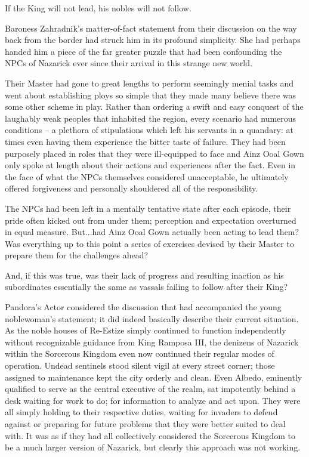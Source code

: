  

If the King will not lead, his nobles will not follow.

 

Baroness Zahradnik’s matter-of-fact statement from their discussion on the way back from the border had struck him in its profound simplicity. She had perhaps handed him a piece of the far greater puzzle that had been confounding the NPCs of Nazarick ever since their arrival in this strange new world.

 

Their Master had gone to great lengths to perform seemingly menial tasks and went about establishing ploys so simple that they made many believe there was some other scheme in play. Rather than ordering a swift and easy conquest of the laughably weak peoples that inhabited the region, every scenario had numerous conditions – a plethora of stipulations which left his servants in a quandary: at times even having them experience the bitter taste of failure. They had been purposely placed in roles that they were ill-equipped to face and Ainz Ooal Gown only spoke at length about their actions and experiences after the fact. Even in the face of what the NPCs themselves considered unacceptable, he ultimately offered forgiveness and personally shouldered all of the responsibility.

 

The NPCs had been left in a mentally tentative state after each episode, their pride often kicked out from under them; perception and expectation overturned in equal measure. But...had Ainz Ooal Gown actually been acting to lead them? Was everything up to this point a series of exercises devised by their Master to prepare them for the challenges ahead?

 

And, if this was true, was their lack of progress and resulting inaction as his subordinates essentially the same as vassals failing to follow after their King?

 

Pandora’s Actor considered the discussion that had accompanied the young noblewoman’s statement; it did indeed basically describe their current situation. As the noble houses of Re-Estize simply continued to function independently without recognizable guidance from King Ramposa III, the denizens of Nazarick within the Sorcerous Kingdom even now continued their regular modes of operation. Undead sentinels stood silent vigil at every street corner; those assigned to maintenance kept the city orderly and clean. Even Albedo, eminently qualified to serve as the central executive of the realm, sat impotently behind a desk waiting for work to do; for information to analyze and act upon. They were all simply holding to their respective duties, waiting for invaders to defend against or preparing for future problems that they were better suited to deal with. It was as if they had all collectively considered the Sorcerous Kingdom to be a much larger version of Nazarick, but clearly this approach was not working.


